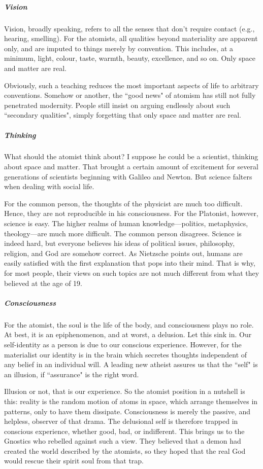 \subparagraph{Vision}
Vision, broadly speaking, refers to all the senses that don't require contact (e.g., hearing, smelling). For the atomists, all qualities beyond materiality are apparent only, and are imputed to things merely by convention. This includes, at a minimum, light, colour, taste, warmth, beauty, excellence, and so on. Only space and matter are real.

Obviously, such a teaching reduces the most important aspects of life to arbitrary conventions. Somehow or another, the ``good news" of atomism has still not fully penetrated modernity. People still insist on arguing endlessly about such ``secondary qualities", simply forgetting that only space and matter are real.

\subparagraph{Thinking}
What should the atomist think about? I suppose he could be a scientist, thinking about space and matter. That brought a certain amount of excitement for several generations of scientists beginning with Galileo and Newton. But science falters when dealing with social life.

For the common person, the thoughts of the physicist are much too difficult. Hence, they are not reproducible in his consciousness. For the Platonist, however, science is easy. The higher realms of human knowledge—politics, metaphysics, theology—are much more difficult. The common person disagrees. Science is indeed hard, but everyone believes his ideas of political issues, philosophy, religion, and God are somehow correct. As Nietzsche points out, humans are easily satisfied with the first explanation that pops into their mind. That is why, for most people, their views on such topics are not much different from what they believed at the age of 19.

\subparagraph{Consciousness}
For the atomist, the soul is the life of the body, and consciousness plays no role. At best, it is an epiphenomenon, and at worst, a delusion. Let this sink in. Our self-identity as a person is due to our conscious experience. However, for the materialist our identity is in the brain which secretes thoughts independent of any belief in an individual will. A leading new atheist assures us that the ``self" is an illusion, if ``assurance" is the right word.

Illusion or not, that is our experience. So the atomist position in a nutshell is this: reality is the random motion of atoms in space, which arrange themselves in patterns, only to have them dissipate. Consciousness is merely the passive, and helpless, observer of that drama. The delusional self is therefore trapped in conscious experience, whether good, bad, or indifferent. This brings us to the Gnostics who rebelled against such a view. They believed that a demon had created the world described by the atomists, so they hoped that the real God would rescue their spirit soul from that trap.

